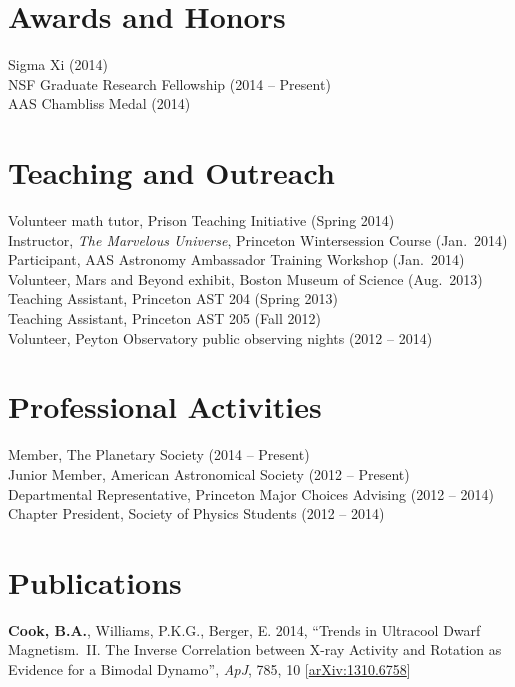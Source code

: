 \documentclass{res}
\begin{document}
\begin{resume}
\section{\textbf{Awards and Honors}}
\vspace{.05in}
Sigma Xi (2014)\\
NSF Graduate Research Fellowship (2014 -- Present)\\
AAS Chambliss Medal (2014)


\section{\textbf{Teaching and Outreach}} 
\vspace{.05in}     
Volunteer math tutor, Prison Teaching Initiative (Spring 2014)\\
Instructor, \textit{The Marvelous Universe}, Princeton Wintersession Course (Jan.~2014)\\
Participant, AAS Astronomy Ambassador Training Workshop (Jan.~2014)\\
Volunteer, Mars and Beyond exhibit, Boston Museum of Science (Aug.~2013)\\
Teaching Assistant, Princeton AST 204 (Spring 2013)\\
Teaching Assistant, Princeton AST 205 (Fall 2012)\\
Volunteer, Peyton Observatory public observing nights (2012
-- 2014)

\section{\textbf{Professional Activities}}
\vspace{0.05in}
Member, The Planetary Society (2014 -- Present)\\
Junior Member, American Astronomical Society (2012 -- Present)\\
Departmental Representative, Princeton Major Choices Advising (2012 -- 2014)\\
Chapter President, Society of Physics Students (2012 -- 2014)


\section{\textbf{Publications}}
\vspace{.05in} \textbf{Cook, B.A.}, Williams, P.K.G., Berger, E. 2014,
``Trends in Ultracool Dwarf Magnetism.~II. The Inverse Correlation
between X-ray Activity and Rotation as Evidence for a Bimodal
Dynamo'', \textit{ApJ}, 785, 10
[\href{http://arxiv.org/abs/1310.6758}{arXiv:1310.6758}]


\end{resume}
\end{document}
